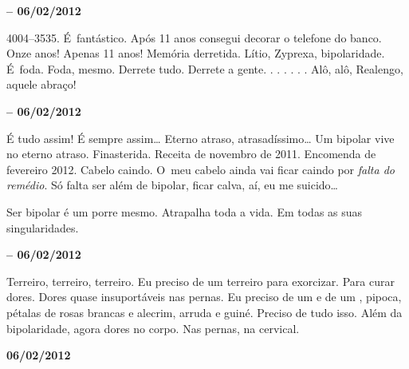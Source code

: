 \begin{center}\asterisc{}\end{center}


\begin{flushright}\textbf{ -- 06/02/2012}\end{flushright}


4004--3535. É~fantástico. Após 11 anos consegui decorar o telefone do
banco. Onze anos! Apenas 11 anos! Memória derretida. Lítio, Zyprexa,
bipolaridade. É~foda. Foda, mesmo. Derrete tudo. Derrete a gente.
. . . \emph{ }. .
\emph{}. Alô, alô, Realengo, aquele abraço!

\begin{center}\asterisc{}\end{center}

\begin{flushright}\textbf{ -- 06/02/2012}\end{flushright}


É tudo assim! É sempre assim… Eterno atraso,
atrasadíssimo… Um bipolar vive no eterno atraso. Finasterida.
Receita de novembro de 2011. Encomenda de fevereiro 2012. Cabelo caindo.
O~meu cabelo ainda vai ficar caindo por \emph{falta do remédio}. Só
falta ser além de bipolar, ficar calva, aí, eu me suicido…

Ser bipolar é um porre mesmo. Atrapalha toda a vida. Em todas as suas
singularidades.

\begin{center}\asterisc{}\end{center}

\begin{flushright}\textbf{ -- 06/02/2012}\end{flushright}


Terreiro, terreiro, terreiro. Eu preciso de um terreiro para exorcizar.
Para curar dores. Dores quase insuportáveis nas pernas. Eu preciso de um
 e de um , pipoca, pétalas de rosas brancas e alecrim, arruda e
guiné. Preciso de tudo isso. Além da bipolaridade, agora dores no corpo.
Nas pernas, na cervical.

\begin{center}\asterisc{}\end{center}

\begin{flushright}\textbf{06/02/2012}\end{flushright}



